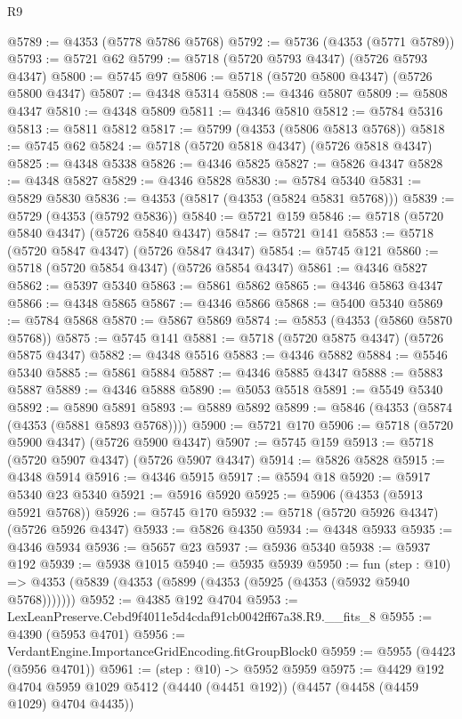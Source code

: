 \begin{lexlean}{R9}
\begin{coremodule}
@5789 := @4353 (@5778 @5786 @5768)
@5792 := @5736 (@4353 (@5771 @5789))
@5793 := @5721 @62
@5799 := @5718 (@5720 @5793 @4347) (@5726 @5793 @4347)
@5800 := @5745 @97
@5806 := @5718 (@5720 @5800 @4347) (@5726 @5800 @4347)
@5807 := @4348 @5314
@5808 := @4346 @5807
@5809 := @5808 @4347
@5810 := @4348 @5809
@5811 := @4346 @5810
@5812 := @5784 @5316
@5813 := @5811 @5812
@5817 := @5799 (@4353 (@5806 @5813 @5768))
@5818 := @5745 @62
@5824 := @5718 (@5720 @5818 @4347) (@5726 @5818 @4347)
@5825 := @4348 @5338
@5826 := @4346 @5825
@5827 := @5826 @4347
@5828 := @4348 @5827
@5829 := @4346 @5828
@5830 := @5784 @5340
@5831 := @5829 @5830
@5836 := @4353 (@5817 (@4353 (@5824 @5831 @5768)))
@5839 := @5729 (@4353 (@5792 @5836))
@5840 := @5721 @159
@5846 := @5718 (@5720 @5840 @4347) (@5726 @5840 @4347)
@5847 := @5721 @141
@5853 := @5718 (@5720 @5847 @4347) (@5726 @5847 @4347)
@5854 := @5745 @121
@5860 := @5718 (@5720 @5854 @4347) (@5726 @5854 @4347)
@5861 := @4346 @5827
@5862 := @5397 @5340
@5863 := @5861 @5862
@5865 := @4346 @5863 @4347
@5866 := @4348 @5865
@5867 := @4346 @5866
@5868 := @5400 @5340
@5869 := @5784 @5868
@5870 := @5867 @5869
@5874 := @5853 (@4353 (@5860 @5870 @5768))
@5875 := @5745 @141
@5881 := @5718 (@5720 @5875 @4347) (@5726 @5875 @4347)
@5882 := @4348 @5516
@5883 := @4346 @5882
@5884 := @5546 @5340
@5885 := @5861 @5884
@5887 := @4346 @5885 @4347
@5888 := @5883 @5887
@5889 := @4346 @5888
@5890 := @5053 @5518
@5891 := @5549 @5340
@5892 := @5890 @5891
@5893 := @5889 @5892
@5899 := @5846 (@4353 (@5874 (@4353 (@5881 @5893 @5768))))
@5900 := @5721 @170
@5906 := @5718 (@5720 @5900 @4347) (@5726 @5900 @4347)
@5907 := @5745 @159
@5913 := @5718 (@5720 @5907 @4347) (@5726 @5907 @4347)
@5914 := @5826 @5828
@5915 := @4348 @5914
@5916 := @4346 @5915
@5917 := @5594 @18
@5920 := @5917 @5340 @23 @5340
@5921 := @5916 @5920
@5925 := @5906 (@4353 (@5913 @5921 @5768))
@5926 := @5745 @170
@5932 := @5718 (@5720 @5926 @4347) (@5726 @5926 @4347)
@5933 := @5826 @4350
@5934 := @4348 @5933
@5935 := @4346 @5934
@5936 := @5657 @23
@5937 := @5936 @5340
@5938 := @5937 @192
@5939 := @5938 @1015
@5940 := @5935 @5939
@5950 := fun (step : @10) =>
  @4353 (@5839 (@4353 (@5899 (@4353 (@5925 (@4353 (@5932 @5940 @5768)))))))
@5952 := @4385 @192 @4704
@5953 := LexLeanPreserve.Cebd9f4011e5d4cdaf91cb0042ff67a38.R9.__fits_8
@5955 := @4390 (@5953 @4701)
@5956 := VerdantEngine.ImportanceGridEncoding.fitGroupBlock0
@5959 := @5955 (@4423 (@5956 @4701))
@5961 := (step : @10) -> @5952 @5959
@5975 := @4429
    @192
    @4704
    @5959
    @1029
    @5412
    (@4440 (@4451 @192))
    (@4457 (@4458 (@4459 @1029) @4704 @4435))

\end{coremodule}
\end{lexlean}
